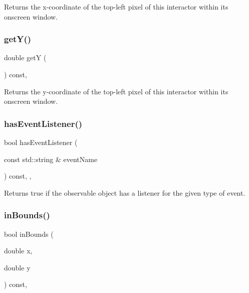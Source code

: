 Returns the x-\/coordinate of the top-\/left pixel of this interactor within its onscreen window. 

\mbox{\label{classGInteractor_aafa51c7f8f38a09febbb9ce7853f77b4}} 
\subsubsection{\texorpdfstring{get\+Y()}{getY()}}
{\footnotesize\ttfamily double getY (\begin{DoxyParamCaption}{ }\end{DoxyParamCaption}) const\hspace{0.3cm}{\ttfamily [virtual]}, {\ttfamily [inherited]}}



Returns the y-\/coordinate of the top-\/left pixel of this interactor within its onscreen window. 

\mbox{\label{classGObservable_a9f6faaa25942923bafa1c44020c49fa9}} 
\subsubsection{\texorpdfstring{has\+Event\+Listener()}{hasEventListener()}}
{\footnotesize\ttfamily bool has\+Event\+Listener (\begin{DoxyParamCaption}\item[{const std\+::string \&}]{event\+Name }\end{DoxyParamCaption}) const\hspace{0.3cm}{\ttfamily [protected]}, {\ttfamily [virtual]}, {\ttfamily [inherited]}}



Returns true if the observable object has a listener for the given type of event. 

\mbox{\label{classGInteractor_afc480f652b8c5f1fb255e2269ce68879}} 
\subsubsection{\texorpdfstring{in\+Bounds()}{inBounds()}\hspace{0.1cm}{\footnotesize\ttfamily [1/2]}}
{\footnotesize\ttfamily bool in\+Bounds (\begin{DoxyParamCaption}\item[{double}]{x,  }\item[{double}]{y }\end{DoxyParamCaption}) const\hspace{0.3cm}{\ttfamily [virtual]}, {\ttfamily [inherited]}}




